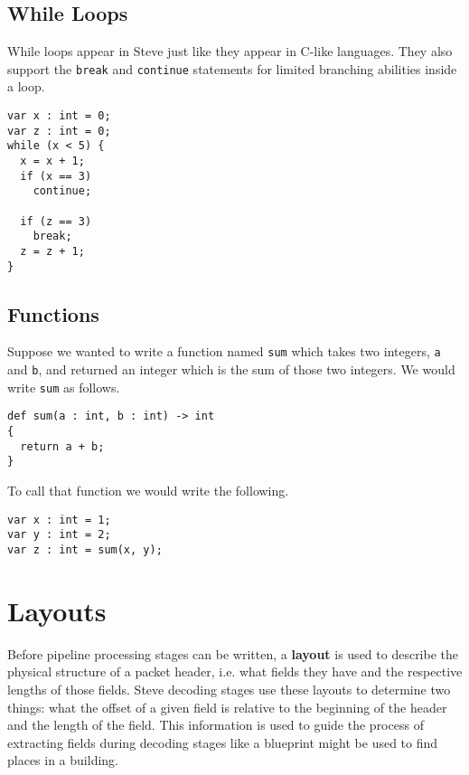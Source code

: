 \subsection{While Loops} \label{while_tut}

While loops appear in Steve just like they appear in C-like languages. They also support the \texttt{break} and \texttt{continue} statements for limited branching abilities inside a loop.

\begin{lstlisting}
var x : int = 0;
var z : int = 0;
while (x < 5) {
  x = x + 1;
  if (x == 3)
    continue;
	
  if (z == 3) 
    break;
  z = z + 1;
}
\end{lstlisting}

\subsection{Functions} \label{function_tut}

Suppose we wanted to write a function named \texttt{sum} which takes two integers, \texttt{a} and \texttt{b}, and returned an integer which is the sum of those two integers. We would write \texttt{sum} as follows.

\begin{lstlisting}
def sum(a : int, b : int) -> int
{
  return a + b;
}
\end{lstlisting}

To call that function we would write the following.

\begin{lstlisting}
var x : int = 1;
var y : int = 2;
var z : int = sum(x, y);
\end{lstlisting}

\section{Layouts} \label{layout_tut}

Before pipeline processing stages can be written, a \textbf{layout} is used to describe the physical structure of a packet header, i.e. what fields they have and the respective lengths of those fields. Steve decoding stages use these layouts to determine two things: what the offset of a given field is relative to the beginning of the header and the length of the field. This information is used to guide the process of extracting fields during decoding stages like a blueprint might be used to find places in a building.

